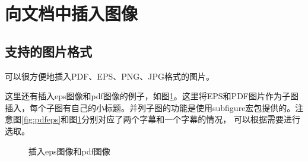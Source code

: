 \section{向文档中插入图像}
\label{sec:insertimage}

\subsection{支持的图片格式}
\label{sec:imageformat}

\XeTeX 可以很方便地插入PDF、EPS、PNG、JPG格式的图片。



这里还有插入eps图像和pdf图像的例子，如图\ref{fig:pdfeps2}。这里将EPS和PDF图片作为子图插入，每个子图有自己的小标题。并列子图的功能是使用subfigure宏包提供的。注意图\ref{fig:pdfeps}和图\ref{fig:pdfeps2}分别对应了两个字幕和一个字幕的情况，
可以根据需要进行选取。

\begin{figure}
  \centering
\end{figure}

\begin{figure}
  \centering
  \hspace{1in}
  \caption{插入eps图像和pdf图像}
  \label{fig:pdfeps2}
\end{figure}

